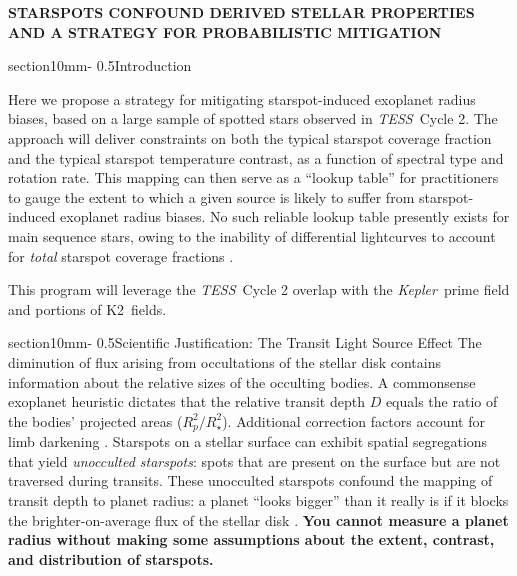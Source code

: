 \documentclass[letterpaper,11pt]{article}
\makeatletter
\renewcommand{\section}{\@startsection%
{section}{1}{0mm}{-\baselineskip}%
{0.5\baselineskip}{\normalfont\Large\bfseries}}%
\newcommand{\tess}{{\it TESS}}
\newcommand{\kepler}{{\it Kepler}}
\newcommand{\ktwo}{{K2}}
\makeatother
\begin{document}
\pagestyle{plain}
\setlength{\bibsep}{0.0pt}
\let\oldbibliography\thebibliography
\renewcommand{\thebibliography}[1]{%
  \oldbibliography{#1}%
  \setlength{\itemsep}{0pt}%
}




\begin{center}
\bfseries\uppercase{%
Starspots confound derived stellar properties and a strategy for probabilistic mitigation
}
\end{center}




\section{Introduction}

Here we propose a strategy for mitigating starspot-induced exoplanet radius biases, based on a large sample of spotted stars observed in \tess\ Cycle 2.  The approach will deliver constraints on both the typical starspot coverage fraction and the typical starspot temperature contrast, as a function of spectral type and rotation rate.  This mapping can then serve as a ``lookup table'' for practitioners to gauge the extent to which a given source is likely to suffer from starspot-induced exoplanet radius biases.  No such reliable lookup table presently exists for main sequence stars, owing to the inability of differential lightcurves to account for \emph{total} starspot coverage fractions \citep{2018ApJ...865..142B}.

This program will leverage the \tess\ Cycle 2 overlap with the \kepler\ prime field and portions of \ktwo\ fields.

\section{Scientific Justification: The Transit Light Source Effect}
The diminution of flux arising from occultations of the stellar disk contains information about the relative sizes of the occulting bodies.  A commonsense exoplanet heuristic dictates that the relative transit depth $D$ equals the ratio of the bodies' projected areas ($R_p^2/R_\star^2$).  Additional correction factors account for limb darkening \citep{2002ApJ...580L.171M}.  Starspots on a stellar surface can exhibit spatial segregations
that yield \emph{unocculted starspots}: spots that are present on the surface but are not traversed during transits.  These unocculted starspots confound the mapping of transit depth to planet radius: a planet ``looks bigger'' than it really is if it blocks the brighter-on-average flux of the stellar disk \citep{2018AJ....156...91M}.  \textbf{You cannot measure a planet radius without making some assumptions about the extent, contrast, and distribution of starspots.}
\end{document}
